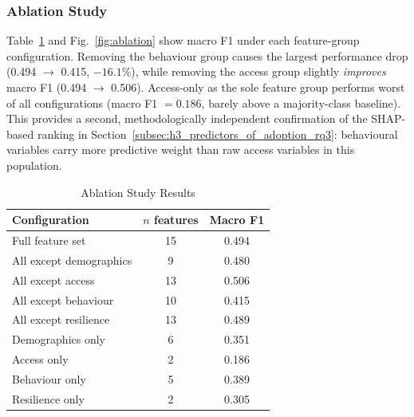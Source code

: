 \documentclass[conference]{IEEEtran}
\begin{document}
\begin{table}[h]
\caption{Feature Means for True-Excluded Cases: Correct vs.\ Misclassified}
\label{tab:error_profile}
\centering
{}
\end{table}
 
\subsubsection{Ablation Study}
\label{subsubsec:ablation_study_results}
Table~\ref{tab:ablation} and Fig.~\ref{fig:ablation} show macro F1 under each feature-group configuration. Removing the behaviour group causes the largest performance drop (0.494 $\rightarrow$ 0.415, $-16.1\%$), while removing the access group slightly \emph{improves} macro F1 (0.494 $\rightarrow$ 0.506). Access-only as the sole feature group performs worst of all configurations (macro F1 $=0.186$, barely above a majority-class baseline). This provides a second, methodologically independent confirmation of the SHAP-based ranking in Section~\ref{subsec:h3_predictors_of_adoption_rq3}: behavioural variables carry more predictive weight than raw access variables in this population.
 
\begin{table}[h]
\caption{Ablation Study Results}
\label{tab:ablation}
\centering
\begin{tabular}{@{}lcc@{}}
\toprule
Configuration & $n$ features & Macro F1 \\
\midrule
Full feature set & 15 & 0.494 \\
All except demographics & 9 & 0.480 \\
All except access & 13 & 0.506 \\
All except behaviour & 10 & 0.415 \\
All except resilience & 13 & 0.489 \\
Demographics only & 6 & 0.351 \\
Access only & 2 & 0.186 \\
Behaviour only & 5 & 0.389 \\
Resilience only & 2 & 0.305 \\
\bottomrule
\end{tabular}
\end{table}
 
\end{document}
